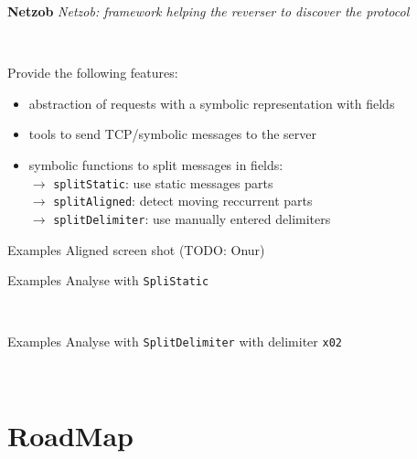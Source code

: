 \documentclass{beamer}
\newcounter{m} %
\newcounter{c} %
\begin{document}
\begin{frame}{\textbf{Netzob}}
  \em{Netzob}: framework helping the reverser to discover the protocol
 
  ~

  Provide the following features:

  \begin{itemize}
    \item abstraction of requests with a symbolic representation with fields
    \item tools to send TCP/symbolic messages to the server
    \item symbolic functions to split messages in fields:\\
    \quad\quad$\rightarrow$ \texttt{splitStatic}: use static messages parts\\
    \quad\quad$\rightarrow$ \texttt{splitAligned}: detect moving reccurrent parts\\
    \quad\quad$\rightarrow$ \texttt{splitDelimiter}: use manually entered delimiters
  \end{itemize}


\end{frame}


\begin{frame}{Examples}
  Aligned screen shot (TODO: Onur)
\end{frame}

\begin{frame}{Examples}
  Analyse with \texttt{SpliStatic}

  ~

  \tiny
\end{frame}

\begin{frame}{Examples}
  Analyse with \texttt{SplitDelimiter} with delimiter \texttt{x02}

  ~

  \tiny
\end{frame}

\section{RoadMap}
\begin{frame}

	\tableofcontents[currentsection]
\end{frame}
\end{document}
